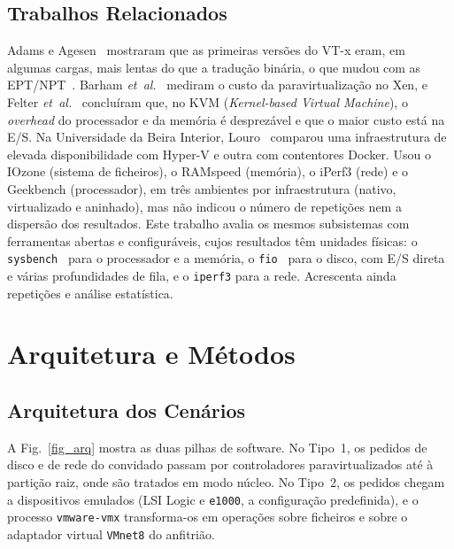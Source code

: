 \documentclass[conference]{IEEEtran}
\begin{document}
\subsection{Trabalhos Relacionados}
Adams e Agesen~\cite{b9} mostraram que as primeiras versões do VT-x eram, em algumas cargas, mais lentas do que a tradução binária, o que mudou com as EPT/NPT~\cite{b10}. Barham \textit{et~al.}~\cite{b8} mediram o custo da paravirtualização no Xen, e Felter \textit{et~al.}~\cite{b13} concluíram que, no KVM (\textit{Kernel-based Virtual Machine}), o \textit{overhead} do processador e da memória é desprezável e que o maior custo está na E/S. Na Universidade da Beira Interior, Louro~\cite{b3} comparou uma infraestrutura de elevada disponibilidade com Hyper-V e outra com contentores Docker. Usou o IOzone (sistema de ficheiros), o RAMspeed (memória), o iPerf3 (rede) e o Geekbench (processador), em três ambientes por infraestrutura (nativo, virtualizado e aninhado), mas não indicou o número de repetições nem a dispersão dos resultados. Este trabalho avalia os mesmos subsistemas com ferramentas abertas e configuráveis, cujos resultados têm unidades físicas: o \texttt{sysbench}~\cite{b5} para o processador e a memória, o \texttt{fio}~\cite{b6} para o disco, com E/S direta e várias profundidades de fila, e o \texttt{iperf3} para a rede. Acrescenta ainda repetições e análise estatística.

\section{Arquitetura e Métodos}\label{sec_met}

\subsection{Arquitetura dos Cenários}
A Fig.~\ref{fig_arq} mostra as duas pilhas de software. No Tipo~1, os pedidos de disco e de rede do convidado passam por controladores paravirtualizados até à partição raiz, onde são tratados em modo núcleo. No Tipo~2, os pedidos chegam a dispositivos emulados (LSI Logic e \texttt{e1000}, a configuração predefinida), e o processo \texttt{vmware-vmx} transforma-os em operações sobre ficheiros e sobre o adaptador virtual \texttt{VMnet8} do anfitrião.
\end{document}
